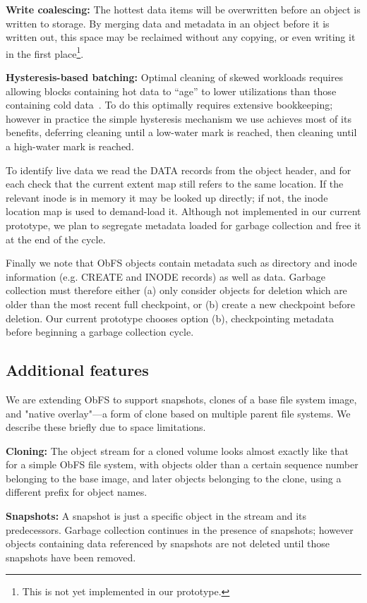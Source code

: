 \documentclass[sigconf,anonymous,10pt]{acmart}
\begin{document}
\begin{CCSXML}
\textbf{Write coalescing:} The hottest data items will be overwritten before an object is written to storage.
  By merging data and metadata in an object before it is written out, this space may be reclaimed without any copying, or even writing it in the first place\footnote{This is not yet implemented in our prototype.}.

\textbf{Hysteresis-based batching:} Optimal cleaning of skewed workloads requires allowing blocks containing hot data to ``age'' to lower utilizations than those containing cold data~\cite{desnoyers_analytic_2014}.
  To do this optimally requires extensive bookkeeping; however in practice the simple hysteresis mechanism we use achieves most of its benefits, deferring cleaning until a low-water mark is reached, then cleaning until a high-water mark is reached.

To identify live data we read the DATA records from the object header, and for each check that the current extent map still refers to the same location.
If the relevant inode is in memory it may be looked up directly; if not, the inode location map is used to demand-load it.
Although not implemented in our current prototype, we plan to segregate metadata loaded for garbage collection and free it at the end of the cycle.

Finally we note that ObFS objects contain metadata such as directory and inode information (e.g. CREATE and INODE records) as well as data.
Garbage collection must therefore either (a) only consider objects for deletion which are older than the most recent full checkpoint, or (b) create a new checkpoint before deletion.
Our current prototype chooses option (b), checkpointing metadata before beginning a garbage collection cycle.

\subsection{Additional features}
We are extending ObFS to support snapshots, clones of a base file system image, and "native overlay"---a form of clone based on multiple parent file systems.
We describe these briefly due to space limitations.

\noindent \textbf{Cloning:} The object stream for a cloned volume looks almost exactly like that for a simple ObFS file system, with objects older than a certain sequence number belonging to the base image, and later objects belonging to the clone, using a different prefix for object names.

\noindent \textbf{Snapshots:} A snapshot is just a specific object in the stream and its predecessors.
Garbage collection continues in the presence of snapshots; however objects containing data referenced by snapshots are not deleted until those snapshots have been removed.


\end{CCSXML}
\end{document}
